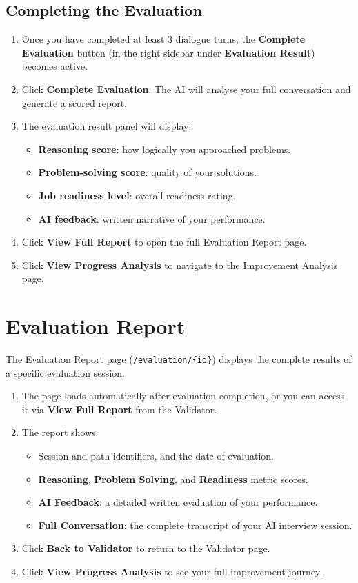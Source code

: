\documentclass{FastFyp}
\begin{document}
\subsection{Completing the Evaluation}
\begin{enumerate}
    \item Once you have completed at least 3 dialogue turns, the \textbf{Complete Evaluation} button (in the right sidebar under \textbf{Evaluation Result}) becomes active.
    \item Click \textbf{Complete Evaluation}. The AI will analyse your full conversation and generate a scored report.
    \item The evaluation result panel will display:
        \begin{itemize}
            \item \textbf{Reasoning score}: how logically you approached problems.
            \item \textbf{Problem-solving score}: quality of your solutions.
            \item \textbf{Job readiness level}: overall readiness rating.
            \item \textbf{AI feedback}: written narrative of your performance.
        \end{itemize}
    \item Click \textbf{View Full Report} to open the full Evaluation Report page.
    \item Click \textbf{View Progress Analysis} to navigate to the Improvement Analysis page.
\end{enumerate}

\section{Evaluation Report}

The Evaluation Report page (\texttt{/evaluation/\{id\}}) displays the complete results of a specific evaluation session.

\begin{enumerate}
    \item The page loads automatically after evaluation completion, or you can access it via \textbf{View Full Report} from the Validator.
    \item The report shows:
        \begin{itemize}
            \item Session and path identifiers, and the date of evaluation.
            \item \textbf{Reasoning}, \textbf{Problem Solving}, and \textbf{Readiness} metric scores.
            \item \textbf{AI Feedback}: a detailed written evaluation of your performance.
            \item \textbf{Full Conversation}: the complete transcript of your AI interview session.
        \end{itemize}
    \item Click \textbf{Back to Validator} to return to the Validator page.
    \item Click \textbf{View Progress Analysis} to see your full improvement journey.
\end{enumerate}
\end{document}
